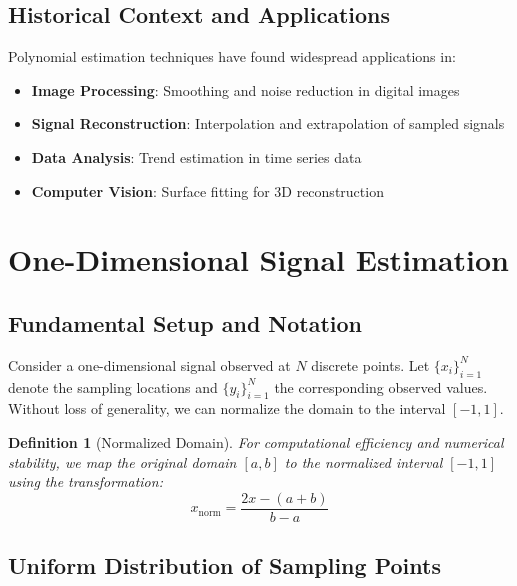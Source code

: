 \documentclass[12pt]{article}
\newtheorem{definition}[theorem]{Definition}
\begin{document}
\subsection{Historical Context and Applications}

Polynomial estimation techniques have found widespread applications in:
\begin{itemize}
    \item \textbf{Image Processing}: Smoothing and noise reduction in digital images
    \item \textbf{Signal Reconstruction}: Interpolation and extrapolation of sampled signals
    \item \textbf{Data Analysis}: Trend estimation in time series data
    \item \textbf{Computer Vision}: Surface fitting for 3D reconstruction
\end{itemize}

\newpage

\section{One-Dimensional Signal Estimation}

\subsection{Fundamental Setup and Notation}

Consider a one-dimensional signal observed at $N$ discrete points. Let $\{x_i\}_{i=1}^N$ denote the sampling locations and $\{y_i\}_{i=1}^N$ the corresponding observed values. Without loss of generality, we can normalize the domain to the interval $[-1, 1]$.

\begin{definition}[Normalized Domain]
    For computational efficiency and numerical stability, we map the original domain $[a, b]$ to the normalized interval $[-1, 1]$ using the transformation:
    \begin{equation}
        x_{\text{norm}} = \frac{2x - (a + b)}{b - a}
    \end{equation}
\end{definition}


\subsection{Uniform Distribution of Sampling Points}
\end{document}
